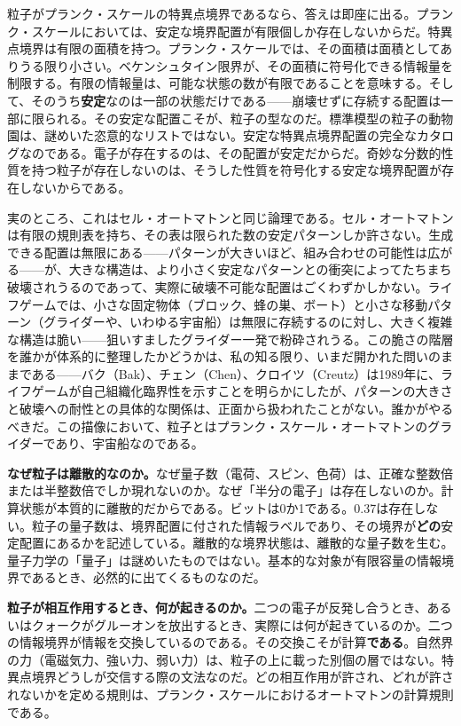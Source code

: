 \documentclass[11pt, twoside, openright]{book}
\begin{document}
粒子がプランク・スケールの特異点境界であるなら、答えは即座に出る。プランク・スケールにおいては、安定な境界配置が有限個しか存在しないからだ。特異点境界は有限の面積を持つ。プランク・スケールでは、その面積は面積としてありうる限り小さい。ベケンシュタイン限界が、その面積に符号化できる情報量を制限する。有限の情報量は、可能な状態の数が有限であることを意味する。そして、そのうち\textbf{安定}なのは一部の状態だけである------崩壊せずに存続する配置は一部に限られる。その安定な配置こそが、粒子の型なのだ。標準模型の粒子の動物園は、謎めいた恣意的なリストではない。安定な特異点境界配置の完全なカタログなのである。電子が存在するのは、その配置が安定だからだ。奇妙な分数的性質を持つ粒子が存在しないのは、そうした性質を符号化する安定な境界配置が存在しないからである。

実のところ、これはセル・オートマトンと同じ論理である。セル・オートマトンは有限の規則表を持ち、その表は限られた数の安定パターンしか許さない。生成できる配置は無限にある------パターンが大きいほど、組み合わせの可能性は広がる------が、大きな構造は、より小さく安定なパターンとの衝突によってたちまち破壊されうるのであって、実際に破壊不可能な配置はごくわずかしかない。ライフゲームでは、小さな固定物体（ブロック、蜂の巣、ボート）と小さな移動パターン（グライダーや、いわゆる宇宙船）は無限に存続するのに対し、大きく複雑な構造は脆い------狙いすましたグライダー一発で粉砕されうる。この脆さの階層を誰かが体系的に整理したかどうかは、私の知る限り、いまだ開かれた問いのままである------バク（Bak）、チェン（Chen）、クロイツ（Creutz）は1989年に、ライフゲームが自己組織化臨界性を示すことを明らかにしたが、パターンの大きさと破壊への耐性との具体的な関係は、正面から扱われたことがない。誰かがやるべきだ。この描像において、粒子とはプランク・スケール・オートマトンのグライダーであり、宇宙船なのである。

\textbf{なぜ粒子は離散的なのか。}なぜ量子数（電荷、スピン、色荷）は、正確な整数倍または半整数倍でしか現れないのか。なぜ「半分の電子」は存在しないのか。計算状態が本質的に離散的だからである。ビットは0か1である。0.37は存在しない。粒子の量子数は、境界配置に付された情報ラベルであり、その境界が\textbf{どの}安定配置にあるかを記述している。離散的な境界状態は、離散的な量子数を生む。量子力学の「量子」は謎めいたものではない。基本的な対象が有限容量の情報境界であるとき、必然的に出てくるものなのだ。

\textbf{粒子が相互作用するとき、何が起きるのか。}二つの電子が反発し合うとき、あるいはクォークがグルーオンを放出するとき、実際には何が起きているのか。二つの情報境界が情報を交換しているのである。その交換こそが計算\textbf{である}。自然界の力（電磁気力、強い力、弱い力）は、粒子の上に載った別個の層ではない。特異点境界どうしが交信する際の文法なのだ。どの相互作用が許され、どれが許されないかを定める規則は、プランク・スケールにおけるオートマトンの計算規則である。
\end{document}
